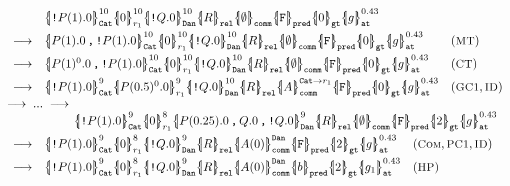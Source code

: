 \begin{figure}[t]
{\footnotesize
\[\hspace*{-1em}
\begin{array}{l}
\begin{array}{lll}
&
\pcellb{\comp{P(1).0}}{10}{\cn{Cat}}
\pcellb{0}{10}{r_1}
\pcellb{\comp{Q.0}}{10}{\cn{Dan}} 
\qcellb{R}{\cn{rel}}
\qcellb{\emptyset}{\cn{comm}}
\qcellb{\cn{F}}{\cn{pred}}
\qcellb{0}{\cn{gt}}
\pcellb{g}{0.43}{\cn{at}}
\\[0.5em]
\longrightarrow&
\pcellb{\pard{P(1).0}{\comp{P(1).0}}}{10}{\cn{Cat}}
\pcellb{0}{10}{r_1}
\pcellb{\comp{Q.0}}{10}{\cn{Dan}} 
\qcellb{R}{\cn{rel}}
\qcellb{\emptyset}{\cn{comm}}
\qcellb{\cn{F}}{\cn{pred}}
\qcellb{0}{\cn{gt}}
\pcellb{g}{0.43}{\cn{at}}
&
(\rulelab{MT})
\\[0.5em]
\longrightarrow&
\pcellb{\pard{P(1)^0.0}{\comp{P(1).0}}}{10}{\cn{Cat}}
\pcellb{0}{10}{r_1}
\pcellb{\comp{Q.0}}{10}{\cn{Dan}} 
\qcellb{R}{\cn{rel}}
\qcellb{\emptyset}{\cn{comm}}
\qcellb{\cn{F}}{\cn{pred}}
\qcellb{0}{\cn{gt}}
\pcellb{g}{0.43}{\cn{at}}
&
(\rulelab{CT})
\\[0.5em]
\longrightarrow&
\pcellb{\comp{P(1).0}}{9}{\cn{Cat}}
\pcellb{P(0.5)^0.0}{9}{r_1}
\pcellb{\comp{Q.0}}{10}{\cn{Dan}} 
\qcellb{R}{\cn{rel}}
\pcellb{A}{\cn{Cat}\rightarrow r_1}{\cn{comm}}
\qcellb{\cn{F}}{\cn{pred}}
\qcellb{0}{\cn{gt}}
\pcellb{g}{0.43}{\cn{at}}
&(\rulelab{GC1},\rulelab{ID})
\end{array}
\\[0.5em]
\longrightarrow\;...\;\longrightarrow\\
\qquad\qquad\quad\;\;
\pcellb{\comp{P(1).0}}{9}{\cn{Cat}}
\pcellb{0}{8}{r_1}
\pcellb{\pard{P(0.25).0}{\pard{Q.0}{\comp{Q.0}}}}{9}{\cn{Dan}} 
\qcellb{R}{\cn{rel}}
\qcellb{\emptyset}{\cn{comm}}
\qcellb{\cn{F}}{\cn{pred}}
\qcellb{2}{\cn{gt}}
\pcellb{g}{0.43}{\cn{at}}
\\[0.5em]
\begin{array}{lll}
\longrightarrow&
\pcellb{\comp{P(1).0}}{9}{\cn{Cat}}
\pcellb{0}{8}{r_1}
\pcellb{\comp{Q.0}}{9}{\cn{Dan}} 
\qcellb{R}{\cn{rel}}
\pcellb{A(0)}{\cn{Dan}}{\cn{comm}}
\qcellb{\cn{F}}{\cn{pred}}
\qcellb{2}{\cn{gt}}
\pcellb{g}{0.43}{\cn{at}}
&
(\rulelab{Com},\rulelab{PC1},\rulelab{ID})
\\[0.5em]
\longrightarrow&
\pcellb{\comp{P(1).0}}{9}{\cn{Cat}}
\pcellb{0}{8}{r_1}
\pcellb{\comp{Q.0}}{9}{\cn{Dan}} 
\qcellb{R}{\cn{rel}}
\pcellb{A(0)}{\cn{Dan}}{\cn{comm}}
\qcellb{b}{\cn{pred}}
\qcellb{2}{\cn{gt}}
\pcellb{g_1}{0.43}{\cn{at}}
&
(\rulelab{HP})
\\[0.5em]

\end{array}
\end{array}\]}
\end{figure}
